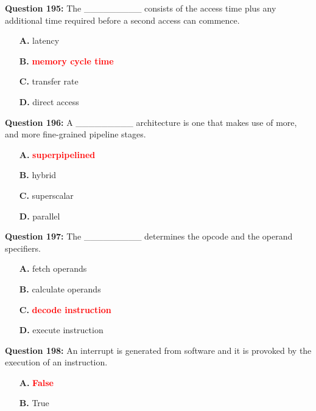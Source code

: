 \documentclass[12pt,a4paper]{article}
\begin{document}
\vspace{0.5cm}

\textbf{Question 195:} The _________ consists of the access time plus any additional time required before a second access can commence.

\begin{itemize}
    \item[\textbf{A.}] latency
    \item[\textbf{B.}] \textcolor{red}{\textbf{memory cycle time}}
    \item[\textbf{C.}] transfer rate
    \item[\textbf{D.}] direct access
\end{itemize}

\vspace{0.5cm}

\textbf{Question 196:} A _________ architecture is one that makes use of more, and more fine-grained pipeline stages.

\begin{itemize}
    \item[\textbf{A.}] \textcolor{red}{\textbf{superpipelined}}
    \item[\textbf{B.}] hybrid
    \item[\textbf{C.}] superscalar
    \item[\textbf{D.}] parallel
\end{itemize}

\vspace{0.5cm}

\textbf{Question 197:} The _________ determines the opcode and the operand specifiers.

\begin{itemize}
    \item[\textbf{A.}] fetch operands
    \item[\textbf{B.}] calculate operands
    \item[\textbf{C.}] \textcolor{red}{\textbf{decode instruction}}
    \item[\textbf{D.}] execute instruction
\end{itemize}

\vspace{0.5cm}

\textbf{Question 198:} An interrupt is generated from software and it is provoked by the execution of an instruction.

\begin{itemize}
    \item[\textbf{A.}] \textcolor{red}{\textbf{False}}
    \item[\textbf{B.}] True
\end{itemize}
\end{document}
